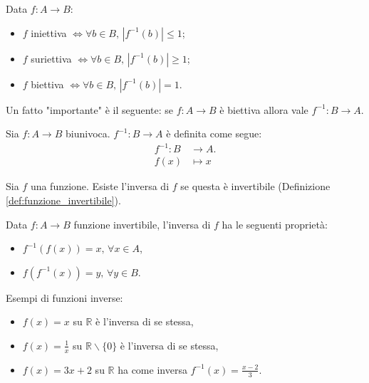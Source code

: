 \begin{remark}
    Data $f\colon A\rightarrow B$:
    \begin{itemize}
        \item $f$ iniettiva $\iff\forall b\in B,\, |f^{-1}(b)|\leq 1$;
        \item $f$ suriettiva $\iff \forall b\in B,\, |f^{-1}(b)|\geq 1$;
        \item $f$ biettiva $\iff\forall b\in B,\, |f^{-1}(b)|=1$.
    \end{itemize}
\end{remark}

Un fatto "importante" è il seguente: se $f\colon A\rightarrow B$ è biettiva allora vale $f^{-1}\colon B\rightarrow A$.

\begin{definition}\label{def:funzione_inversa}
    Sia $f\colon A\rightarrow B$ biunivoca. $f^{-1}\colon B\rightarrow A$ è definita come segue:
    \begin{align*}
        f^{-1} \colon  B & \rightarrow A.\\
        f(x) & \mapsto x
    \end{align*}
\end{definition}

\begin{proposition}
    Sia $f$ una funzione. Esiste l'inversa di $f$ se questa è invertibile (Definizione \ref{def:funzione_invertibile}). 
\end{proposition}

\begin{property}
    Data $f\colon A\rightarrow B$ funzione invertibile, l'inversa di $f$ ha le seguenti proprietà:
    \begin{itemize}
        \item $f^{-1}(f(x))=x,\, \forall x\in A$,
        \item $f(f^{-1}(x))=y,\, \forall y\in B$.
    \end{itemize}
\end{property}

\begin{example}
    Esempi di funzioni inverse:
    \begin{itemize}
        \item $f(x)=x$ su $\mathbb R$ è l'inversa di se stessa,
        \item $f(x)=\frac{1}{x}$ su $\mathbb R\backslash\{0\}$ è l'inversa di se stessa,
        \item $f(x)=3x+2$ su $\mathbb R$ ha come inversa $f^{-1}(x)=\frac{x-2}{3}$.
    \end{itemize}
\end{example}

